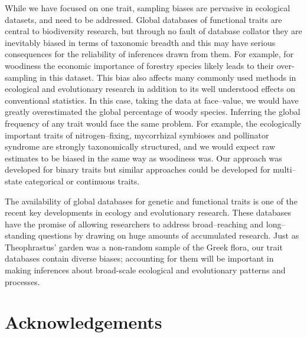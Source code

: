 \documentclass[a4paper,12pt]{article}
\begin{document}
While we have focused on one trait, sampling biases are pervasive in ecological datasets, and need to be addressed.
Global databases of functional traits
\citep[e.g., TRY;][]{kattge2011try} are central to biodiversity
research, but through no fault of database collator they are inevitably biased in terms of taxonomic breadth
and this may have serious consequences for the reliability of
inferences drawn from them.
For example, for woodiness the economic importance of forestry species
likely leads to their
over-sampling in this dataset.
This bias also affects many commonly used methods in ecological and evolutionary research \citep[e.g.,][]{ackerly2000taxon,nakagawa2008missing,pennell2013integrative} in addition to its well understood effects on conventional statistics.  In this case, taking the data at face--value, 
we would have greatly overestimated
the global percentage of woody species.  Inferring the global
frequency of any trait would face the same problem.  For
example, the ecologically important traits of nitrogen--fixing,
mycorrhizal symbioses and pollinator syndrome are strongly
taxonomically structured, and we would expect raw estimates to be
biased in the same way as woodiness was.  Our approach was developed
for binary traits
but similar approaches could be developed for multi--state categorical or continuous traits.

The availability of global databases for genetic and functional traits is one of the recent key developments in ecology and evolutionary research.  These databases have the promise of allowing researchers to address broad--reaching and long--standing questions by drawing on huge amounts of accumulated research.  
Just as Theophrastus' garden was a non-random sample of the Greek
flora, our trait databases contain diverse biases; accounting for
them will be important in making inferences about broad-scale
ecological and evolutionary patterns and processes.

\section{Acknowledgements}
\end{document}
